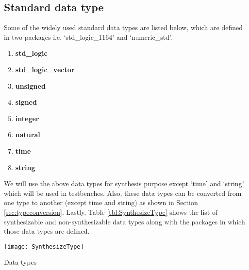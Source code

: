 \subsection{Standard data type}
Some of the widely used standard data types are listed below,  which are defined in two packages i.e. `std\_logic\_1164' and `numeric\_std'.  

\begin{multicols}{4}
	\begin{enumerate}
		\item \textbf{std\_logic}
		\item \textbf{std\_logic\_vector}
		\item \textbf{unsigned}
		\item \textbf{signed}
		\item \textbf{integer}
		\item \textbf{natural}
		\item \textbf{time}
		\item \textbf{string}
	\end{enumerate}
\end{multicols}

We will use the above data types for synthesis purpose except `time' and `string' which will be used in testbenches. Also, these data types can be converted from one type to another (except time and string) as shown in Section \ref{sec:typeconversion}. Lastly, Table \ref{tbl:SynthesizeType} shows the list of synthesizable and non-synthesizable data types along with the packages in which those data types are defined.

\begin{table}
	\centering
	\texttt{[image: SynthesizeType]}
	\caption{Data types}
	\label{tbl:SynthesizeType}
\end{table}


